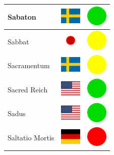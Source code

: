 \documentclass[12pt, a4paper, twoside]{report}
\begin{document}
\begin{center}
\begin{longtable}{|p{5cm}|p{2cm}|p{2cm}|}
 Sabaton                                                    & \includegraphics[width=1cm]{../4x3/se} &   \includegraphics[width=1cm]{../likes/y} \\ \hline
 Sabbat                                                     & \includegraphics[width=1cm]{../4x3/jp} &   \includegraphics[width=1cm]{../likes/m} \\ \hline
 Sacramentum﻿                                                & \includegraphics[width=1cm]{../4x3/se} &   \includegraphics[width=1cm]{../likes/m} \\ \hline
 Sacred Reich                                               & \includegraphics[width=1cm]{../4x3/us} &   \includegraphics[width=1cm]{../likes/y} \\ \hline
 Sadus                                                      & \includegraphics[width=1cm]{../4x3/us} &   \includegraphics[width=1cm]{../likes/y} \\ \hline
 Saltatio Mortis                                            & \includegraphics[width=1cm]{../4x3/de} &   \includegraphics[width=1cm]{../likes/n} \\ \hline

\end{longtable}
\end{center}
\end{document}
